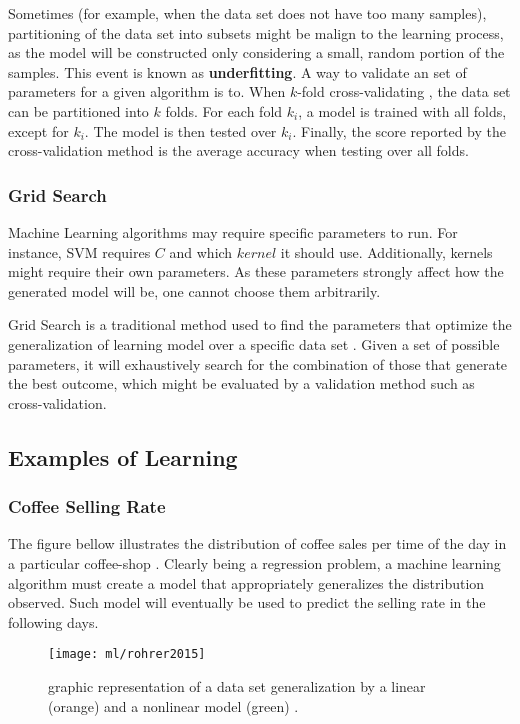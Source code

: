 Sometimes (for example, when the data set does not have too many samples), partitioning of the data set into subsets might be malign to the learning process, as the model will be constructed only considering a small, random portion of the samples. This event is known as \textbf{underfitting}. A way to validate an set of parameters for a given algorithm is to. When $k$-fold cross-validating \cite{crossvalid}, the data set can be partitioned into $k$ folds. For each fold $k_i$, a model is trained with all folds, except for $k_i$. The model is then tested over $k_i$. Finally, the score reported by the cross-validation method is the average accuracy when testing over all folds.

\subsubsection{Grid Search}

Machine Learning algorithms may require specific parameters to run. For instance, SVM requires $C$ and which $kernel$ it should use. Additionally, kernels might require their own parameters. As these parameters strongly affect how the generated model will be, one cannot choose them arbitrarily.

Grid Search is a traditional method used to find the parameters that optimize the generalization of learning model over a specific data set \cite{gridsearch}. Given a set of possible parameters, it will exhaustively search for the combination of those that generate the best outcome, which might be evaluated by a validation method such as cross-validation.

\subsection{Examples of Learning}

\subsubsection{Coffee Selling Rate}

The figure bellow illustrates the distribution of coffee sales per time of the day in a particular coffee-shop \cite{roh2015}. Clearly being a regression problem, a machine learning algorithm must create a model that appropriately generalizes the distribution observed. Such model will eventually be used to predict the selling rate in the following days.

\begin{figure}[H]
	\centering
	\captionsetup{justification=centering}

	\texttt{[image: ml/rohrer2015]}
	\caption{graphic representation of a data set generalization by a linear (orange) and a nonlinear model (green) \cite{roh2015}.}
	\label{fig:rohrer2015}
\end{figure}

